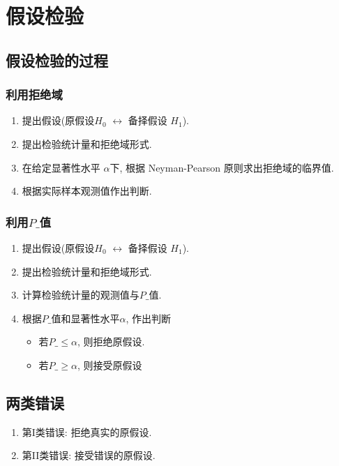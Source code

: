 \newpage
\section{假设检验}

\subsection{假设检验的过程}
\subsubsection{利用拒绝域}
\begin{enumerate}
    \item 提出假设(原假设$H_0$ $\longleftrightarrow$ 备择假设 $H_1$). 
    \item 提出检验统计量和拒绝域形式.
    \item 在给定显著性水平 $\alpha$下, 根据 Neyman-Pearson 原则求出拒绝域的临界值.
    \item 根据实际样本观测值作出判断. 
\end{enumerate}

\subsubsection{利用\texorpdfstring{$P\_$}.值}
\begin{enumerate}
    \item 提出假设(原假设$H_0$ $\longleftrightarrow$ 备择假设 $H_1$). 
    \item 提出检验统计量和拒绝域形式.
    \item 计算检验统计量的观测值与$P\_$值. 
    \item 根据$P\_$值和显著性水平$\alpha$, 作出判断
    \begin{itemize}
        \item 若$P\_ \le \alpha$, 则拒绝原假设.
        \item 若$P\_ \ge \alpha$, 则接受原假设
    \end{itemize}
\end{enumerate}

\subsection{两类错误}
\begin{enumerate}
    \item 第I类错误: 拒绝真实的原假设. 
    \item 第II类错误: 接受错误的原假设. 
\end{enumerate}

